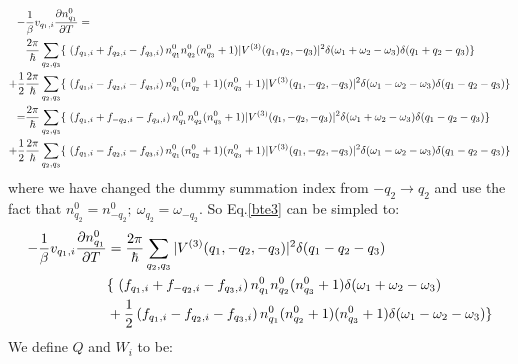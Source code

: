 \documentclass{article}
\newcommand{\pfrac}[2]{\frac{\partial #1}{\partial #2}}
\begin{document}
\begin{align}
    - &\frac{1}{\beta} v_{q_1,i} \pfrac{n_{q_1}^0}{T} =  \notag \\ 
     &\frac{2\pi}{\hbar} \sum_{q_2,q_3} \{\ \left( f_{q_1,i} + f_{q_2,i} - f_{q_3,i} \right) 
            n_{q_1}^0 n_{q_2}^0 (n_{q_3}^0 + 1) |V^{(3)}(q_1, q_2, -q_3)|^2 
            \delta(\omega_1 + \omega_2 - \omega_3) \delta(q_1 + q_2 - q_3) \} \notag\\
    + \frac{1}{2} &\frac{2\pi}{\hbar}\sum_{q_2,q_3} \{\ \left( f_{q_1,i} - f_{q_2,i} - f_{q_3,i} \right) 
            n_{q_1}^0 (n_{q_2}^0+1) (n_{q_3}^0 + 1) |V^{(3)}(q_1, -q_2, -q_3)|^2 
            \delta(\omega_1 - \omega_2 - \omega_3)\delta(q_1 - q_2 - q_3) \} \notag\\
    = &\frac{2\pi}{\hbar} \sum_{q_2,q_3} \{\ \left( f_{q_1,i} + f_{-q_2,i} - f_{q_3,i} \right) 
            n_{q_1}^0 n_{q_2}^0 (n_{q_3}^0 + 1) |V^{(3)}(q_1, -q_2, -q_3)|^2 
            \delta(\omega_1 + \omega_2 - \omega_3) \delta(q_1 - q_2 - q_3) \} \notag\\
    + \frac{1}{2} &\frac{2\pi}{\hbar}\sum_{q_2,q_3} \{\ \left( f_{q_1,i} - f_{q_2,i} - f_{q_3,i} \right) 
            n_{q_1}^0 (n_{q_2}^0+1) (n_{q_3}^0 + 1) |V^{(3)}(q_1, -q_2, -q_3)|^2 
            \delta(\omega_1 - \omega_2 - \omega_3)\delta(q_1 - q_2 - q_3) \} 
\end{align}
where we have changed the dummy summation index from $-q_2 \to q_2$ and use the fact that 
$n_{q_2}^0 = n_{-q_2}^0;\ \omega_{q_2} = \omega_{-q_2} $. So Eq.\ref{bte3} can be simpled to:
\begin{align}
    - \frac{1}{\beta} v_{q_1,i} \pfrac{n_{q_1}^0}{T} & =
        \frac{2\pi}{\hbar} \sum_{q_2,q_3} |V^{(3)}(q_1, -q_2, -q_3)|^2 \delta(q_1 - q_2 - q_3) \notag \\ 
    & \{\ \left( f_{q_1,i} + f_{-q_2,i} - f_{q_3,i} \right)  n_{q_1}^0 n_{q_2}^0 (n_{q_3}^0 + 1) \delta(\omega_1 + \omega_2 - \omega_3) \notag \\
    & + \frac{1}{2} \left( f_{q_1,i} - f_{q_2,i} - f_{q_3,i} \right) n_{q_1}^0 (n_{q_2}^0+1) (n_{q_3}^0 + 1) \delta(\omega_1 - \omega_2 - \omega_3) \}
\end{align}
We define $Q$ and $W_i$ to be:
\end{document}
